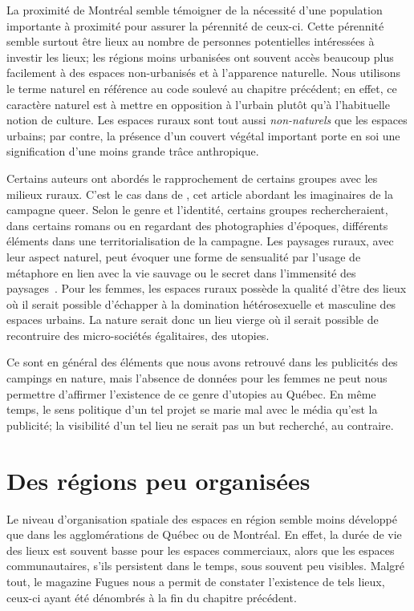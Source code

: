 La proximité de Montréal semble témoigner de la nécessité d'une population importante à proximité pour assurer la pérennité de ceux-ci.
Cette pérennité semble surtout être lieux au nombre de personnes potentielles intéressées à investir les lieux; les régions moins urbanisées ont souvent accès beaucoup plus facilement à des espaces non-urbanisés et à l'apparence naturelle.
Nous utilisons le terme naturel en référence au code soulevé au chapitre précédent; en effet, ce caractère naturel est à mettre en opposition à l'urbain plutôt qu'à l'habituelle notion de culture.
Les espaces ruraux sont tout aussi \emph{non-naturels} que les espaces urbains; par contre, la présence d'un couvert végétal important porte en soi une signification d'une moins grande trâce anthropique.

Certains auteurs ont abordés le rapprochement de certains groupes \lgbt{} avec les milieux ruraux.
C'est le cas dans  de \citeauthor{Bell1995a}, cet article abordant les imaginaires de la campagne queer.
Selon le genre et l'identité, certains groupes rechercheraient, dans certains romans ou en regardant des photographies d'époques, différents éléments dans une territorialisation de la campagne.
Les paysages ruraux, avec leur aspect naturel, peut évoquer une forme de sensualité par l'usage de métaphore en lien avec la vie sauvage ou le secret dans l'immensité des paysages~\citep[114]{Bell1995a}.
Pour les femmes, les espaces ruraux possède la qualité d'être des lieux où il serait possible d'échapper à la domination hétérosexuelle et masculine des espaces urbains.
La nature serait donc un lieu vierge où il serait possible de recontruire des micro-sociétés égalitaires, des utopies.

Ce sont en général des éléments que nous avons retrouvé dans les publicités des campings en nature, mais l'absence de données pour les femmes ne peut nous permettre d'affirmer l'existence de ce genre d'utopies au Québec.
En même temps, le sens politique d'un tel projet se marie mal avec le média qu'est la publicité; la visibilité d'un tel lieu ne serait pas un but recherché, au contraire.

\section{Des régions peu organisées}
\label{sec:des_regions_peu_organisees}
Le niveau d'organisation spatiale des espaces en région semble moins développé que dans les agglomérations de Québec ou de Montréal.
En effet, la durée de vie des lieux est souvent basse pour les espaces commerciaux, alors que les espaces communautaires, s'ils persistent dans le temps, sous souvent peu visibles.
Malgré tout, le magazine Fugues nous a permit de constater l'existence de tels lieux, ceux-ci ayant été dénombrés à la fin du chapitre précédent.

